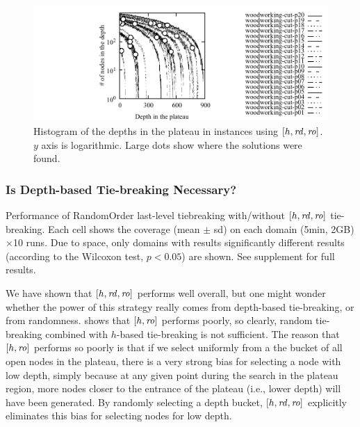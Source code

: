\begin{figure}[tb]
 \centering {}
 \includegraphics{tables/aaai16-log-rd/2zerocost/depth-histogram-lmcut_rdlog1-woodworking-cut.pdf}
 \caption{Histogram of the depths in the plateau in
 instances using $[h,\mbox{\textit{rd}},\mbox{\textit{ro}}]$. $y$ axis is logarithmic.
 Large dots show where the solutions were found.
 }
 \label{depth-histogram}
\end{figure}


\subsubsection{Is Depth-based Tie-breaking Necessary?}


\begin{table}[tb]
 \setlength{\tabcolsep}{0.3em}
 \centering {}
 
 \caption{Performance of RandomOrder last-level tiebreaking with/without $[h,\mbox{\textit{rd}},\mbox{\textit{ro}}]$ tie-breaking. Each cell
 shows the coverage (mean $\pm$ sd) on each domain (5min, 2GB)$\times$10 runs. 
Due to space, only domains with results 
 significantly different results  (according to the Wilcoxon test, $p<0.05$) are shown.
See supplement for full results.
 }  \label{r-vs-rd-random}
\end{table}

We have shown that $[h,\mbox{\textit{rd}},\mbox{\textit{ro}}]$ performs well overall, but
one might wonder whether the power of this strategy really comes from depth-based tie-breaking, or from randomness.
 shows that $[h,\mbox{\textit{ro}}]$ performs poorly, so clearly, random tie-breaking combined with $h$-based tie-breaking is not sufficient.
The reason that $[h,\mbox{\textit{ro}}]$ performs so poorly is that if we select uniformly from a the bucket of all open nodes in the plateau, there is a very strong bias for selecting a node with low depth, simply because at any given point during the search in the plateau region, more nodes closer to the entrance of the plateau (i.e., lower depth) will have been generated.
By randomly selecting a depth bucket, $[h,\mbox{\textit{rd}},\mbox{\textit{ro}}]$ explicitly eliminates this bias for selecting nodes for low depth.

